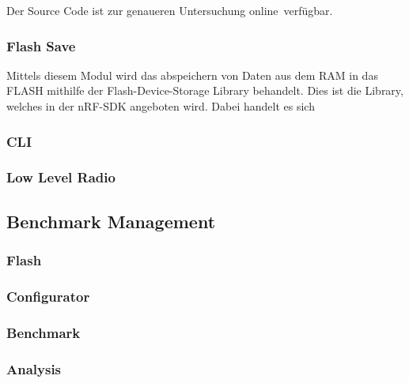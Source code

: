 Der Source Code ist zur genaueren Untersuchung online\footnotemark\ verfügbar. 


\subsubsection{Flash Save}\label{subsubsec:FlashSave}

Mittels diesem Modul wird das abspeichern von Daten aus dem RAM in das FLASH mithilfe der Flash-Device-Storage Library behandelt. Dies ist die Library, welches in der nRF-SDK angeboten wird. Dabei handelt es sich  

\subsubsection{CLI}\label{subsubsec:CLI}



\subsubsection{Low Level Radio}\label{subsubsec:LowLevelRadio}


\subsection{Benchmark Management}\label{subsec:Benchmark Management}

\subsubsection{Flash}\label{subsubsec:Flash}

\subsubsection{Configurator}\label{subsubsec:Configurator}

\subsubsection{Benchmark}\label{subsubsec:Benchmark}

\subsubsection{Analysis}\label{subsubsec:Analysis}

